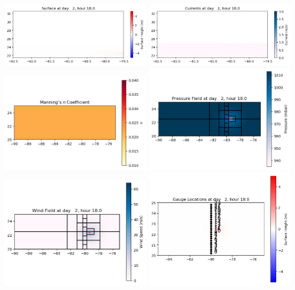 \documentclass[11pt]{article}
\begin{document}
\vskip 10pt 
\includegraphics[width=0.475\textwidth]{frame0011fig1003.png}
\includegraphics[width=0.475\textwidth]{frame0011fig1004.png}
\vskip 10pt 
\includegraphics[width=0.475\textwidth]{frame0011fig1005.png}
\includegraphics[width=0.475\textwidth]{frame0011fig1006.png}
\vskip 10pt 
\includegraphics[width=0.475\textwidth]{frame0011fig1007.png}
\includegraphics[width=0.475\textwidth]{frame0011fig1008.png}
\end{document}
